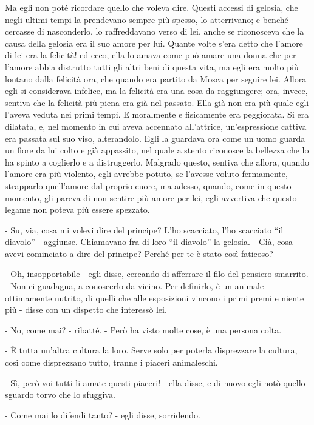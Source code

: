 Ma egli non poté ricordare quello che voleva dire. Questi accessi di gelosia, che negli ultimi tempi la prendevano sempre più spesso, lo atterrivano; e benché cercasse di nasconderlo, lo raffreddavano verso di lei, anche se riconosceva che la causa della gelosia era il suo amore per lui. Quante volte s'era detto che l'amore di lei era la felicità! ed ecco, ella lo amava come può amare una donna che per l'amore abbia distrutto tutti gli altri beni di questa vita, ma egli era molto più lontano dalla felicità ora, che quando era partito da Mosca per seguire lei. Allora egli si considerava infelice, ma la felicità era una cosa da raggiungere; ora, invece, sentiva che la felicità più piena era già nel passato. Ella già non era più quale egli l'aveva veduta nei primi tempi. E moralmente e fisicamente era peggiorata. Si era dilatata, e, nel momento in cui aveva accennato all'attrice, un'espressione cattiva era passata sul suo viso, alterandolo. Egli la guardava ora come un uomo guarda un fiore da lui colto e già appassito, nel quale a stento riconosce la bellezza che lo ha spinto a coglierlo e a distruggerlo. Malgrado questo, sentiva che allora, quando l'amore era più violento, egli avrebbe potuto, se l'avesse voluto fermamente, strapparlo quell'amore dal proprio cuore, ma adesso, quando, come in questo momento, gli pareva di non sentire più amore per lei, egli avvertiva che questo legame non poteva più essere spezzato. 

- Su, via, cosa mi volevi dire del principe? L'ho scacciato, l'ho scacciato ``il diavolo'' - aggiunse. Chiamavano fra di loro ``il diavolo'' la gelosia. - Già, cosa avevi cominciato a dire del principe? Perché per te è stato così faticoso? 

- Oh, insopportabile - egli disse, cercando di afferrare il filo del pensiero smarrito. - Non ci guadagna, a conoscerlo da vicino. Per definirlo, è un animale ottimamente nutrito, di quelli che alle esposizioni vincono i primi premi e niente più - disse con un dispetto che interessò lei. 

- No, come mai? - ribatté. - Però ha visto molte cose, è una persona colta. 

- È tutta un'altra cultura la loro. Serve solo per poterla disprezzare la cultura, così come disprezzano tutto, tranne i piaceri animaleschi. 

- Sì, però voi tutti li amate questi piaceri! - ella disse, e di nuovo egli notò quello sguardo torvo che lo sfuggiva. 

- Come mai lo difendi tanto? - egli disse, sorridendo. 

